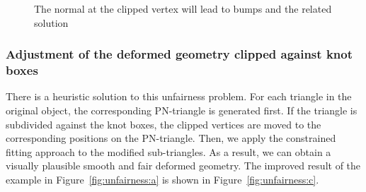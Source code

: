 \documentclass[3p]{elsarticle}
\begin{document}
\begin{figure}[htbp]
\begin{center}
\begin{minipage}[c]{0.36\textwidth}
		\caption{The normal at the clipped vertex will lead to bumps and the related solution}
		\label{fig:linear_normal}
	\end{minipage}
\end{center}
\end{figure}

\subsubsection{Adjustment of the deformed geometry clipped against knot boxes}
\label{sec:clipped}

There is a heuristic solution to this unfairness problem. For each triangle in the original object, the corresponding
PN-triangle is generated first. If the triangle is subdivided against the knot boxes, the clipped vertices are moved to
the corresponding positions on the PN-triangle. Then, we apply the constrained fitting approach to the modified
sub-triangles. As a result, we can obtain a visually plausible smooth and fair deformed geometry. The improved result of
the example in Figure~\ref{fig:unfairness:a} is shown in Figure~\ref{fig:unfairness:c}.
\end{document}
